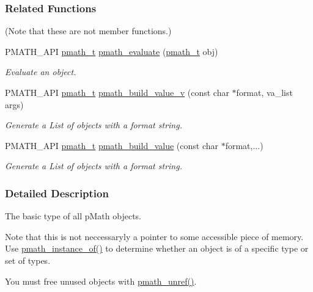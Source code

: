 \subsubsection*{Related Functions}
(Note that these are not member functions.) \begin{CompactItemize}
\item 
PMATH\_\-API \hyperlink{classpmath__t}{pmath\_\-t} \hyperlink{classpmath__t_d95c86ef0de178de4d3560518c8a8157}{pmath\_\-evaluate} (\hyperlink{classpmath__t}{pmath\_\-t} obj)
\begin{CompactList}\small\item\em Evaluate an object. \item\end{CompactList}\item 
PMATH\_\-API \hyperlink{classpmath__t}{pmath\_\-t} \hyperlink{group__helpers_g96660afa0732edf675653eb6ddeab0a4}{pmath\_\-build\_\-value\_\-v} (const char $\ast$format, va\_\-list args)
\begin{CompactList}\small\item\em Generate a List of objects with a format string. \item\end{CompactList}\item 
PMATH\_\-API \hyperlink{classpmath__t}{pmath\_\-t} \hyperlink{group__helpers_g13a748aa283c5f5408cce037d3ad224d}{pmath\_\-build\_\-value} (const char $\ast$format,...)
\begin{CompactList}\small\item\em Generate a List of objects with a format string. \item\end{CompactList}\end{CompactItemize}


\subsubsection{Detailed Description}
The basic type of all pMath objects. 

Note that this is not neccessaryly a pointer to some accessible piece of memory. Use \hyperlink{classpmath__t_0bd527f1ec2db8f1eba58e1fd84babbc}{pmath\_\-instance\_\-of()} to determine whether an object is of a specific type or set of types.

You must free unused objects with \hyperlink{classpmath__t_54e905402c38940687033b87eb8c6c9f}{pmath\_\-unref()}. 

